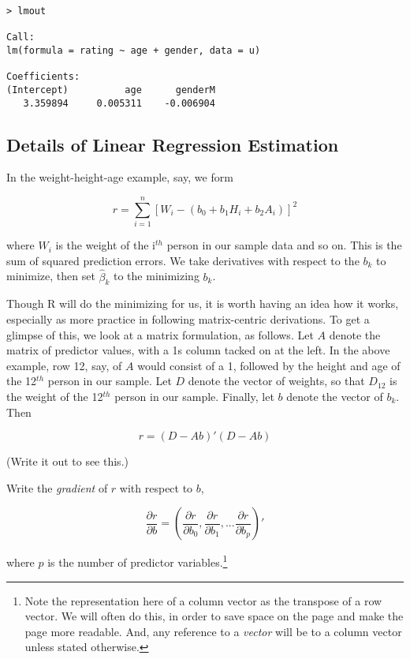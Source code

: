 \begin{lstlisting}
> lmout

Call:
lm(formula = rating ~ age + gender, data = u)

Coefficients:
(Intercept)          age      genderM  
   3.359894     0.005311    -0.006904  
\end{lstlisting}

\subsection{Details of Linear Regression Estimation}
\label{lmdetails}

In the weight-height-age example, say, we form 

\begin{equation}
\label{rss}
r =
\sum_{i=1}^n [W_i - (b_0 + b_1 H_i + b_2 A_i)]^2
\end{equation}

where $W_i$ is the weight of the i$^{th}$ person in our sample data and
so on. This is the sum of squared prediction errors.  We take derivatives
with respect to the $b_k$ to minimize, then set $\widehat{\beta}_k$ to
the minimizing $b_k$.  

Though R will do the minimizing for us, it is worth having an idea how
it works, especially as more practice in following matrix-centric
derivations.  To get a glimpse of this, we look at a matrix formulation, as
follows.  Let $A$ denote the matrix of predictor values, with a 1s
column tacked on at the left.  In the above example, row 12, say, of $A$
would consist of a 1, followed by the height and age of the 12$^{th}$
person in our sample.  Let $D$ denote the vector of weights, so that
$D_{12}$ is the weight of the 12$^{th}$ person in our sample.  Finally,
let $b$ denote the vector of $b_k$.  Then

\begin{equation}
\label{}
r = (D - A b)' (D - Ab)
\end{equation}

(Write it out to see this.)

Write the \textit{gradient} of $r$ with respect to $b$,

\begin{equation}
\frac{\partial r}{\partial b} = (
\frac{\partial r}{\partial b_0},
\frac{\partial r}{\partial b_1},
...
\frac{\partial r}{\partial b_p}
)'
\end{equation}

where $p$ is the number of predictor variables.\footnote{Note the
representation here of a column vector as the transpose of a row vector.
We will often do this, in order to save space on the page and make the
page more readable.  And, any reference to a \textit{vector} will be to
a column vector unless stated otherwise.}

